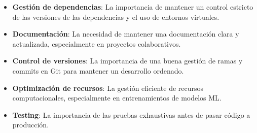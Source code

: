 \begin{itemize}
    \item \textbf{Gestión de dependencias}: La importancia de mantener un control estricto de las versiones de las dependencias y el uso de entornos virtuales.
    
    \item \textbf{Documentación}: La necesidad de mantener una documentación clara y actualizada, especialmente en proyectos colaborativos.
    
    \item \textbf{Control de versiones}: La importancia de una buena gestión de ramas y commits en Git para mantener un desarrollo ordenado.
    
    \item \textbf{Optimización de recursos}: La gestión eficiente de recursos computacionales, especialmente en entrenamientos de modelos ML.
    
    \item \textbf{Testing}: La importancia de las pruebas exhaustivas antes de pasar código a producción.
\end{itemize}
